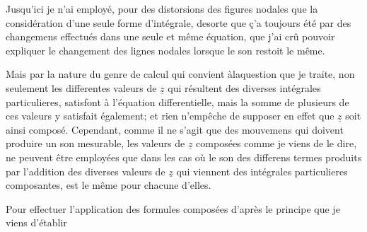 \documentclass[11pt,a4paper]{article}
\begin{document}

Jusqu'ici je n'ai employé, pour   des distorsions
des figures nodales que la considération d'une seule forme
d'intégrale, desorte que ç'a toujours été par des changemens
 effectués dans une seule et même équation, que
j'ai crû pouvoir expliquer le changement des lignes nodales
lorsque le son restoit le même.

Mais par la nature du genre de calcul qui convient
àlaquestion que je traite, non seulement les differentes
valeurs de $\underline{z}$ qui résultent des diverses intégrales
particulieres, satisfont à l'équation differentielle, mais
la somme de plusieurs de ces valeurs y satisfait
également; et rien n'empêche de supposer en effet
que $\underline{z}$ soit ainsi composé. Cependant, comme il 
ne s'agit que des mouvemens qui doivent produire
un son mesurable, les valeurs de $\underline{z}$ composées comme
je viens de le dire, ne peuvent être employées
que dans les cas où le son des differens termes
produits par l'addition des diverses valeurs de
$\underline{z}$ qui viennent des intégrales particulieres
composantes, est le même pour chacune d'elles.

Pour effectuer l'application des formules composées
d'après le principe que je viens d'établir

\end{document}

